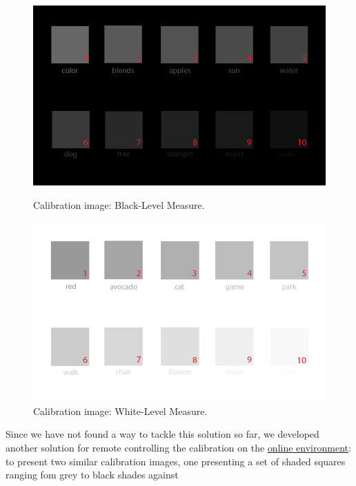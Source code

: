 \begin{figure}[htbp]
  \centering
  \begin{minipage}{0.48\textwidth}
		\centering
	  \includegraphics[width=\textwidth]{images/implementation/calibration_blackLevel.jpg}
	  \caption[Calibration image: Black-Level Measure.]{Calibration image: Black-Level Measure.}
	  \label{fig:black_level}
  \end{minipage}\hfill
  \begin{minipage}{0.48\textwidth}
		\centering
	  \includegraphics[width=\textwidth]{images/implementation/calibration_whiteLevel.jpg}
	  \caption[Calibration image: White-Level Measure.]{Calibration image: White-Level Measure.}
	  \label{fig:white_level}
  \end{minipage}
\end{figure}
%
Since we have not found a way to tackle this solution so far, we developed another solution for remote controlling the calibration on the
\ul{online environment}: to present two similar calibration images, one presenting a set of shaded squares ranging fom grey to black shades against

